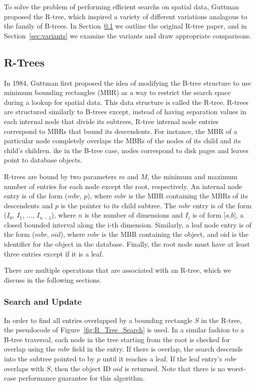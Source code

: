 To solve the problem of performing efficient searchs on spatial data, 
Guttman proposed the R-tree, which inspired a variety of different 
variations analagous to the family of B-trees. In Section~\ref{sec:rtrees}
we outline the original R-tree paper, and in Section~\ref{sec:variants}
we examine the variants and draw appropriate comparisons.

\subsection{R-Trees}
\label{sec:rtrees}
In 1984, Guttman first proposed the idea of modifying the B-tree structure to
use minimum bounding rectangles (MBR) as a way to restrict the search space 
during a lookup for spatial data. This data structure is called the R-tree.
R-trees are structured similarly to B-trees except, instead of having separation
values in each internal node that divide its subtrees, R-tree internal node
entries correspond to MBRs that bound its descendents. For instance, the MBR of 
a particular node completely overlaps the MBRs of the nodes of its child and 
its child's children. ike in the B-tree case, nodes correspond to disk pages 
and leaves point to database objects.

R-trees are bound by two parameters $m$ and $M$, the minimum and maximum number
of entries for each node except the root, respectively. An internal node entry 
is of the form ($mbr$, $p$), where $mbr$ is the MBR containing the MBRs of its 
descendents and $p$ is the pointer to its child subtree. The $mbr$ entry is of 
the form ($I_{0}$, $I_{1}$, ..., $I_{n-1}$), where $n$ is the number of 
dimensions and $I_{i}$ is of form $[a$,$b]$, a closed bounded interval along 
the i-th dimension. Similarly, a leaf node entry is of the form ($mbr$, $oid$), 
where $mbr$ is the MBR containing the object, and oid is the identifier for the 
object in the database. Finally, the root node must have at least three entries
except if it is a leaf.

There are multiple operations that are associated with an R-tree, which we 
discuss in the following sections.

\subsubsection{Search and Update}
In order to find all entries overlapped by a bounding rectangle $S$ in the 
R-tree, the pseudocode of Figure~\ref{fig:R_Tree_Search} is used. In a similar 
fashion to a B-tree traversal, each node in the tree starting from the root is 
checked for overlap using the $mbr$ field in the entry. If there is overlap, 
the search descends into the subtree pointed to by $p$ until it reaches a leaf. 
If the leaf entry's $mbr$ overlaps with $S$, then the object ID $oid$ is 
returned. Note that there is no worst-case performance guarantee for this
algorithm.

